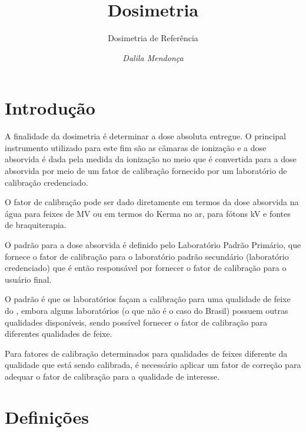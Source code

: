 \documentclass[11pt,a4paper]{article}
\title{\LobsterTwo\Large{Dosimetria}}
\author{\LobsterTwo\large{Dosimetria de Referência\nocite{*}}}
\date{\LobsterTwo\textit{Dalila Mendonça}}
\begin{document}
	\maketitle

    \section{Introdução}

    A finalidade da dosimetria é determinar a dose absoluta entregue.  O principal instrumento utilizado para este fim são as câmaras de ionização e a dose absorvida é dada pela medida da ionização no meio que é convertida para a dose absorvida por meio de um fator de calibração fornecido por um laboratório de calibração credenciado.

    O fator de calibração pode ser dado diretamente em termos da dose absorvida na água para feixes de MV ou em termos do Kerma no ar, para fótons kV e fontes de braquiterapia.

    O padrão para a dose absorvida é definido pelo Laboratório Padrão Primário, que fornece o fator de calibração para o laboratório padrão secundário (laboratório credenciado) que é então responsável por fornecer o fator de calibração para o usuário final.

    O padrão é que os laboratórios façam a calibração para uma qualidade de feixe do , embora alguns laboratórios (o que não é o caso do Brasil) possuem outras qualidades disponíveis, sendo possível fornecer o fator de calibração para diferentes qualidades de feixe. 

    Para fatores de calibração determinados para qualidades de feixes diferente da qualidade que está sendo calibrada, é necessário aplicar um fator de correção para adequar o fator de calibração para a qualidade de interesse.

	\section{Definições}
\end{document}

